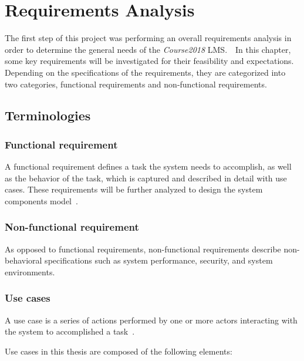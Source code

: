 

\chapter{Requirements Analysis}
\label{chap:REQS}

The first step of this project was performing an overall requirements analysis
in order to determine the general needs of the \emph{Course2018} LMS.\ \ 
In this chapter, some key requirements will be investigated for their
feasibility and expectations.
Depending on the specifications of the requirements, they are categorized into
two categories, functional requirements and non-functional requirements.

\section{Terminologies}

\subsection{Functional requirement}
\label{sec:FUNC_REQS}
A functional requirement defines a task the system needs to accomplish,
as well as the behavior of the task, which is captured and described in detail
with use cases.
These requirements will be further analyzed to design the system components
model~\cite{functionalReqs}.

\subsection{Non-functional requirement}
As opposed to functional requirements, non-functional requirements describe
non-behavioral specifications such as system performance, security, and system
environments.

\subsection{Use cases}
A use case is a series of actions performed by one or more actors interacting
with the system to accomplished a task~\cite{useCase}.

\medskip 

Use cases in this thesis are composed of the following elements:

